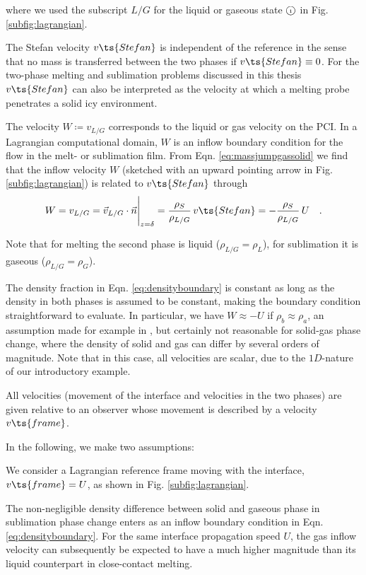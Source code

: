 where we used the subscript $L/G$ for the liquid or gaseous state  $\mbox{\textcircled{\tiny 1}}$ in Fig. \ref{subfig:lagrangian}. 

The Stefan velocity $v\ts{Stefan}$ is independent of the reference in the sense that no mass is transferred between the two phases if $v\ts{Stefan}\equiv 0$. For the two-phase melting and sublimation problems discussed in this thesis $v\ts{Stefan}$ can also be interpreted as the velocity at which a melting probe penetrates a solid icy environment.

The velocity $W\coloneqq v_{L/G}$ corresponds to the liquid or gas velocity on the \gls{PCI}. In a Lagrangian computational domain, $W$ is an inflow boundary condition for the flow in the melt- or sublimation film.
From Eqn. \ref{eq:massjumpgassolid} we find that the inflow velocity $W$ (sketched with an upward pointing arrow in Fig. \ref{subfig:lagrangian}) is related to $v\ts{Stefan}$ through
\begin{equation} \label{eq:densityboundary}
    W = v_{L/G} = \Vec{v}_{L/G}\cdot\Vec{n}\Bigg\rvert_{z=\delta} = \frac{\rho_S}{\rho_{L/G}}\, v\ts{Stefan} = -\frac{\rho_S}{\rho_{L/G}}\, U \quad .
\end{equation}

Note that for melting the second phase is liquid ($\rho_{L/G} = \rho_L$), for sublimation it is gaseous ($\rho_{L/G} = \rho_G$).

The density fraction in Eqn. \ref{eq:densityboundary} is constant as long as the density in both phases is assumed to be constant, making the boundary condition straightforward to evaluate. In particular, we have $W\approx -U$ if $\rho_b \approx \rho_a$, an assumption made for example in \cite{schuller2016curvilinearccm}, but certainly not reasonable for solid-gas phase change, where the density of solid and gas can differ by several orders of magnitude. Note that in this case, all velocities are scalar, due to the $1D$-nature of our introductory example. 

All velocities (movement of the interface and velocities in the two phases) are given relative to an observer whose movement is described by a velocity $v\ts{frame}$. 

In the following, we make two assumptions:
\begin{itemize}
    \begin{framed}
    \item We consider a Lagrangian reference frame moving with the interface, $v\ts{frame}=U$, as shown in Fig. \ref{subfig:lagrangian}.
    \item The non-negligible density difference between solid and gaseous phase in sublimation phase change enters as an inflow boundary condition in Eqn. \ref{eq:densityboundary}. For the same interface propagation speed $U$, the gas inflow velocity can subsequently be expected to have a much higher magnitude than its liquid counterpart in close-contact melting.
    \end{framed}
\end{itemize}


